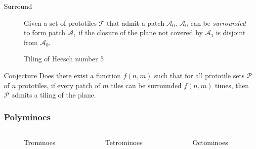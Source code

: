 \documentclass{beamer}
\begin{document}
\begin{frame} 
    \begin{description} 
        \item[Surround] Given a set of prototiles $\mathscr{T}$ that admit a patch $\mathscr{A}_0$, $\mathscr{A}_0$ can be \emph{surrounded} to form patch $\mathscr{A}_1$ if the closure of the plane not covered by $\mathscr{A}_1$ is disjoint from $\mathscr{A}_0$.
    \end{description} 
    \begin{figure} 
    \center 
     
    \caption{Tiling of Heesch number 5\footnotemark} 
    \end{figure}
\end{frame}

\begin{frame} 
    \begin{block}{Conjecture}
    Does there exist a function $f(n, m)$ such that for all prototile sets $\mathscr{P}$ of $n$ prototiles, if every patch of $m$ tiles can be surrounded $f(n, m)$ times, then $\mathscr{P}$ admits a tiling of the plane.
    \end{block} 
\end{frame} 

\begin{frame} 
    \frametitle{Polyminoes} 
    \begin{columns} 
            \begin{figure} 
                \center 
                 
                \caption{Trominoes\footnotemark} 
            \end{figure}
            \begin{figure} 
                \center 
                 
                \caption{Tetrominoes\footnotemark} 
            \end{figure}
            \begin{figure} 
                \center 
                 
                \caption{Octominoes\footnotemark} 
            \end{figure}
        \end{columns} 
\end{frame} 
\end{document}
